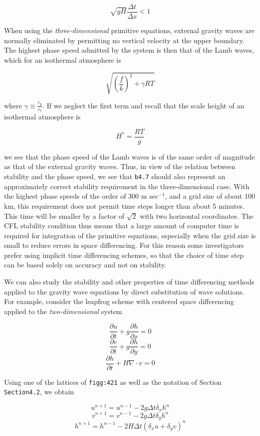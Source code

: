 \[\sqrt{gH}\frac{\Delta t}{\Delta x} < 1\]

When using the \emph{three-dimensional} primitive equations, external
gravity waves are normally eliminated by permitting no vertical
velocity at the upper boundary. The highest phase speed admitted by the
system is then that of the Lamb waves, which for an isothermal
atmosphere is

\[\sqrt{\left( \frac{f}{k} \right)^{2} + \gamma RT}\]

where \(\gamma \equiv \frac{c_{p}}{c_{v}}\). If we neglect the first
term and recall that the scale height of an isothermal atmosphere is

\[H^{*} = \frac{RT}{g}\]

we see that the phase speed of the Lamb waves is of the same order of
magnitude as that of the external gravity waves. Thus, in view of the
relation between stability and the phase speed, we see that
\texttt{b4.7} should also represent an approximately correct stability
requirement in the three-dimensional case. With the highest phase speeds
of the order of 300 m \(\text{sec}^{-1}\), and a grid size of about 100
km, this requirement does not permit time steps longer than about 5
minutes. This time will be smaller by a factor of \(\sqrt{2}\) with two
horizontal coordinates. The CFL stability condition thus means that a
large amount of computer time is required for integration of the
primitive equations, especially when the grid size is small to reduce
errors in space differencing. For this reason some investigators prefer
using implicit time differencing schemes, so that the choice of time
step can be based solely on accuracy and not on stability.

We can also study the stability and other properties of time
differencing methods applied to the gravity wave equations by direct
substitution of wave solutions. For example, consider the leapfrog
scheme with centered space differencing applied to the
\emph{two-dimensional} system

\[\frac{\partial u}{\partial t} + g\frac{\partial h}{\partial x} = 0\]\[\frac{\partial v}{\partial t} + g\frac{\partial h}{\partial y} = 0\]\[\frac{\partial h}{\partial t} + H\nabla\cdot v = 0\]

Using one of the lattices of \texttt{figg:421} as well as the notation
of Section \texttt{Section4.2}, we obtain

\[u^{n+1} = u^{n-1} -2 g \Delta t \delta_x h^n\]\[v^{n+1} = v^{n-1} -2 g \Delta t \delta_y h^n\]\[h^{n+1} = h^{n-1} -2 H \Delta t ( \delta_x u + \delta_y v)^n\]

